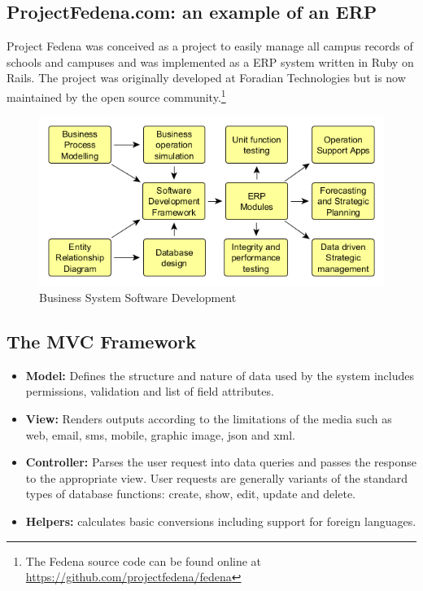 \documentclass[]{book}
\providecommand{\tightlist}{%
  \setlength{\itemsep}{0pt}\setlength{\parskip}{0pt}}
\let\rmarkdownfootnote\footnote%
\def\footnote{\protect\rmarkdownfootnote}
\begin{document}
\hypertarget{projectfedena.com-an-example-of-an-erp}{%
\subsection{ProjectFedena.com: an example of an ERP}\label{projectfedena.com-an-example-of-an-erp}}

Project Fedena was conceived as a project to easily manage all campus records of schools and campuses and was implemented as a ERP system written in Ruby on Rails. The project was originally developed at Foradian Technologies but is now maintained by the open source community.\footnote{The Fedena source code can be found online at \url{https://github.com/projectfedena/fedena}}

\begin{figure}
\centering
\includegraphics{images/softwaresystems.png}
\caption{Business System Software Development}
\end{figure}

\hypertarget{the-mvc-framework}{%
\subsection{The MVC Framework}\label{the-mvc-framework}}

\begin{itemize}
\tightlist
\item
  \textbf{Model:} Defines the structure and nature of data used by the system includes permissions, validation and list of field attributes.
\item
  \textbf{View:} Renders outputs according to the limitations of the media such as web, email, sms, mobile, graphic image, json and xml.
\item
  \textbf{Controller:} Parses the user request into data queries and passes the response to the appropriate view. User requests are generally variants of the standard types of database functions: create, show, edit, update and delete.
\item
  \textbf{Helpers:} calculates basic conversions including support for foreign languages.
\end{itemize}
\end{document}

